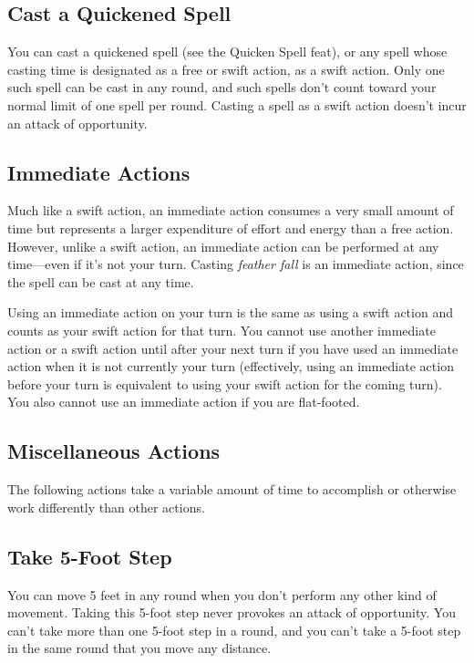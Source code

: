 \subsection{Cast a Quickened Spell}

				
You can cast a quickened spell (see the Quicken Spell feat), or any spell whose casting time is designated as a free or swift action, as a swift action. Only one such spell can be cast in any round, and such spells don't count toward your normal limit of one spell per round. Casting a spell as a swift action doesn't incur an attack of opportunity.
				
\subsection{Immediate Actions}

				
Much like a swift action, an immediate action consumes a very small amount of time but represents a larger expenditure of effort and energy than a free action. However, unlike a swift action, an immediate action can be performed at any time---even if it's not your turn. Casting \textit{feather fall} is an immediate action, since the spell can be cast at any time.
				
Using an immediate action on your turn is the same as using a swift action and counts as your swift action for that turn. You cannot use another immediate action or a swift action until after your next turn if you have used an immediate action when it is not currently your turn (effectively, using an immediate action before your turn is equivalent to using your swift action for the coming turn). You also cannot use an immediate action if you are flat-footed.
				
\subsection{Miscellaneous Actions}

				
The following actions take a variable amount of time to accomplish or otherwise work differently than other actions.
				
\subsection{Take 5-Foot Step}

				
You can move 5 feet in any round when you don't perform any other kind of movement. Taking this 5-foot step never provokes an attack of opportunity. You can't take more than one 5-foot step in a round, and you can't take a 5-foot step in the same round that you move any distance.
				
